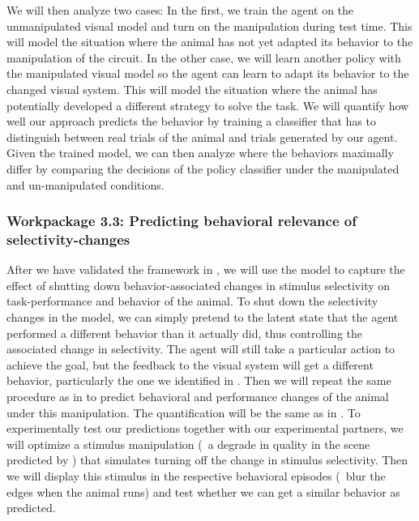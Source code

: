 \documentclass[B2,COG]{ercgrant}
\begin{document}
We will then analyze two cases: In the first, we train the agent on the unmanipulated visual model and turn on the manipulation during test time. 
This will model the situation where the animal has not yet adapted its behavior to the manipulation of the circuit. 
In the other case, we will learn another policy with the manipulated visual model so the agent can learn to adapt its behavior to the changed visual system. 
This will model the situation where the animal has potentially developed a different strategy to solve the task. 
We will quantify how well our approach predicts the behavior by training a classifier that has to distinguish between real trials of the animal and trials generated by our agent. 
Given the trained model, we can then analyze where the behaviors maximally differ by comparing the decisions of the policy classifier under the manipulated and un-manipulated conditions. 

\subsubsection{Workpackage 3.3: Predicting behavioral relevance of selectivity-changes\hfill{}}

After we have validated the framework in , we will use the model to capture the effect of shutting down behavior-associated changes in stimulus selectivity on task-performance and behavior of the animal. 
To shut down the selectivity changes in the model, we can simply pretend to the latent state that the agent performed a different behavior than it actually did, thus controlling the associated change in selectivity. 
The agent will still take a particular action to achieve the goal, but the feedback to the visual system will get a different behavior, particularly the one we identified in .
Then we will repeat the same procedure as in  to predict behavioral and performance changes of the animal under this manipulation. 
The quantification will be the same as in .
To experimentally test our predictions together with our experimental partners, we will optimize a stimulus manipulation (\eg~a degrade in quality in the scene predicted by ) that simulates turning off the change in stimulus selectivity. 
Then we will display this stimulus in the respective behavioral episodes (\eg~blur the edges when the animal runs) and test whether we can get a similar behavior as predicted.
\end{document}
